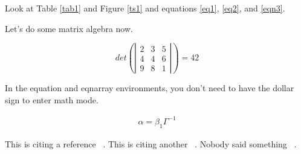 Look at Table \ref{tab1} and Figure \ref{ts1} and equations \ref{eq1},  \ref{eq2}, and \ref{eqn3}.

Let's do some matrix algebra now.

\begin{equation}
det\left(\left|\begin{array}{ccc} 2 & 3 & 5\\
4 & 4 & 6\\
9 & 8 & 1
\end{array}\right|\right) = 42
\end{equation}

In the equation and eqnarray environments, you don't need to have the dollar sign to enter math mode.

\begin{eqnarray}
\alpha = \beta_1 \Gamma^{-1}
\end{eqnarray}

This is citing a reference ~\cite{mygood11111}.  This is citing another ~\cite{mrx05}.  Nobody said something ~\cite{Nobody06}.
